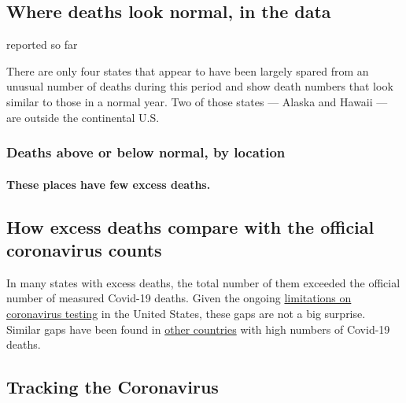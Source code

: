 \hypertarget{where-deaths-look-normal-in-the-data}{%
\subsection{Where deaths look normal, in the
data}\label{where-deaths-look-normal-in-the-data}}

reported so far

There are only four states that appear to have been largely spared from
an unusual number of deaths during this period and show death numbers
that look similar to those in a normal year. Two of those states ---
Alaska and Hawaii --- are outside the continental U.S.

\hypertarget{deaths-above-or-below-normal-by-location-2}{%
\subsubsection{Deaths above or below normal, by
location}\label{deaths-above-or-below-normal-by-location-2}}

\hypertarget{these-places-have-few-excess-deaths}{%
\paragraph{These places have few excess
deaths.}\label{these-places-have-few-excess-deaths}}

\hypertarget{how-excess-deaths-compare-with-the-official-coronavirus-counts}{%
\subsection{How excess deaths compare with the official coronavirus
counts}\label{how-excess-deaths-compare-with-the-official-coronavirus-counts}}

In many states with excess deaths, the total number of them exceeded the
official number of measured Covid-19 deaths. Given the ongoing
\href{https://www.nytimes.com/interactive/2020/04/17/us/coronavirus-testing-states.html}{limitations
on coronavirus testing} in the United States, these gaps are not a big
surprise. Similar gaps have been found in
\href{https://www.nytimes.com/interactive/2020/04/21/world/coronavirus-missing-deaths.html}{other
countries} with high numbers of Covid-19 deaths.

\hypertarget{tracking-the-coronavirus}{%
\subsection{Tracking the Coronavirus}\label{tracking-the-coronavirus}}

